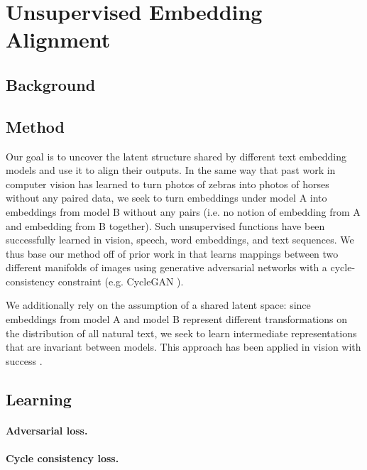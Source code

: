 \section{Unsupervised Embedding Alignment}

\subsection{Background}

\subsection{Method}

Our goal is to uncover the latent structure shared by different text embedding models and use it to align their outputs. In the same way that past work in computer vision \citep{huang2018multimodalunsupervisedimagetoimagetranslation, liu2018unsupervisedimagetoimagetranslationnetworks,zhu2020unpairedimagetoimagetranslationusing} has learned to turn photos of zebras into photos of horses without any paired data, we seek to turn embeddings under model A into embeddings from model B without any pairs (i.e. no notion of embedding from A and embedding from B together). Such unsupervised functions have been successfully learned in vision, speech, word embeddings, and text sequences. We thus base our method off of prior work in  that learns mappings between two different manifolds of images using generative adversarial networks with a cycle-consistency constraint (e.g. CycleGAN \citep{zhu2020unpairedimagetoimagetranslationusing}).



We additionally rely on the assumption of a shared latent space: since embeddings from model A and model B represent different transformations on the distribution of all natural text, we seek to learn intermediate representations that are invariant between models. This approach has been applied in vision with success \citep{liu2018unsupervisedimagetoimagetranslationnetworks}.


\subsection{Learning}


\paragraph{Adversarial loss.}


\paragraph{Cycle consistency loss.}



